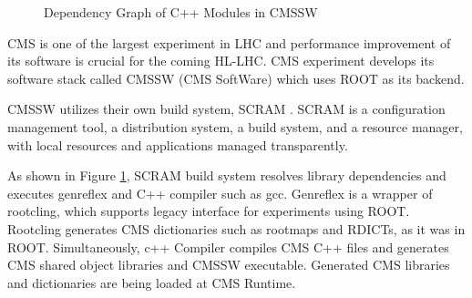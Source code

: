 \documentclass[12pt]{iopart}
\begin{document}
\begin{figure}[!h]
  \centering
  \caption{Dependency Graph of C++ Modules in CMSSW}
  \label{fig:graphofcmssw}
\end{figure}

CMS \cite{cms} is one of the largest experiment in LHC and performance improvement of its software is crucial for the coming HL-LHC. CMS experiment develops its software stack called CMSSW (CMS SoftWare) which uses ROOT as its backend.

CMSSW utilizes their own build system, SCRAM \cite{scram}. SCRAM is a configuration management tool, a distribution system, a build system, and a resource manager, with local resources and applications managed transparently.

As shown in Figure \ref{fig:graphofcmssw}, SCRAM build system resolves library dependencies and executes genreflex and C++ compiler such as gcc. Genreflex is a wrapper of rootcling, which supports legacy interface for experiments using ROOT. Rootcling generates CMS dictionaries such as rootmaps and RDICTs, as it was in ROOT. Simultaneously, c++ Compiler compiles CMS C++ files and generates CMS shared object libraries and CMSSW executable. Generated CMS libraries and dictionaries are being loaded at CMS Runtime.
\end{document}
